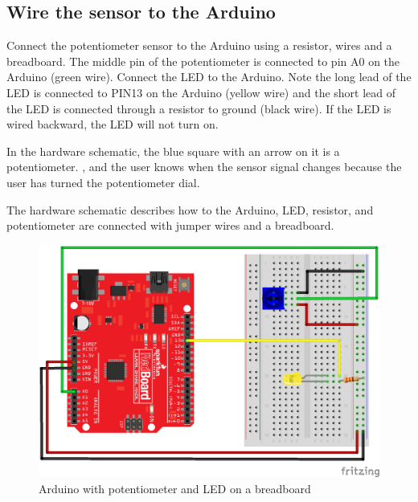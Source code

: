 \documentclass{book}
\makeatletter
\def\maxwidth{\ifdim\Gin@nat@width>\linewidth\linewidth
    \else\Gin@nat@width\fi}
\let\Oldincludegraphics\includegraphics
\renewcommand{\includegraphics}[1]{\Oldincludegraphics[width=.8\maxwidth]{#1}}
\makeatother
\begin{document}
    
        \subsection{Wire the sensor to the
Arduino}\label{wire-the-sensor-to-the-arduino}
    




    
        Connect the potentiometer sensor to the Arduino using a resistor, wires
and a breadboard. The middle pin of the potentiometer is connected to
pin A0 on the Arduino (green wire). Connect the LED to the Arduino. Note
the long lead of the LED is connected to PIN13 on the Arduino (yellow
wire) and the short lead of the LED is connected through a resistor to
ground (black wire). If the LED is wired backward, the LED will not turn
on.

In the hardware schematic, the blue square with an arrow on it is a
potentiometer. , and the user knows when the sensor signal changes
because the user has turned the potentiometer dial.

The hardware schematic describes how to the Arduino, LED, resistor, and
potentiometer are connected with jumper wires and a breadboard.
    




    
        \begin{figure}
\centering
\includegraphics{images/redboard_pot_led_fritzing.png}
\caption{Arduino with potentiometer and LED on a breadboard}
\end{figure}
    




    
\end{document}
